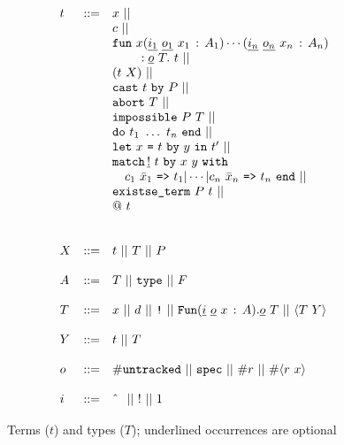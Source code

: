\documentclass[9pt,natbib]{sigplanconf}
\newcommand{\Eq}[0]{\texttt{=}}
\newcommand{\bang}[0]{\texttt{!}}
\begin{document}
\begin{figure}
\[
\begin{array}{lll}
t & ::= & x\ || \\
\ & \ &   c\ ||\\ 
\ & \ &    \texttt{fun}\ x(\underline{i_1}\ \underline{o_1}\ x_1\,:\,A_1)\cdots(\underline{i_n}\ \underline{o_n}\ x_n\,:\, A_n)\\
\ & \ & \ \ \ \ \ \ \  : \underline{o}\ T .\ t\ ||\\
\ & \ &    (t\ X)\ || \\ 
\ & \ &         \texttt{cast}\ t\ \texttt{by}\ P  \ ||\\
\ & \ &  \texttt{abort}\ T\ ||\\ 
\ & \ &  \texttt{impossible}\ P\ T\ ||\\ 
\ & \ &  \texttt{do}\ t_1\ \ldots\ t_n\ \texttt{end}\ ||\\ 
\ & \ &  \texttt{let}\ x\ \Eq\ t\ \texttt{by}\ y\ \texttt{in}\ t' \ ||\ 
\\ 
\ & \ &  \texttt{match}\, \underline{!}\ t\ \texttt{by}\ x\ y \ \texttt{with}\\
\ & \ &  \ \ \ c_1\ \bar{x}_1\ \texttt{=>}\ t_1 |
 \cdots | c_n\ \bar{x}_n\ \texttt{=>}\ t_n\ \texttt{end}\ ||\\
\ & \ &  \texttt{existse\_term}\ P\ t\ || \\
\ & \ &  @\ t \\
\\
\\
X & ::= & t\ ||\ T\ ||\ P
\\
\\
A & ::= & T\ ||\ \texttt{type}\ ||\ F 
\\
\\
T & ::= & x\ ||\ d\ ||\ \bang\ ||\ 
     \texttt{Fun}(\underline{i}\ \underline{o}\ x\,:\,A) . \underline{o}\ T\ ||\ \langle T\ Y\rangle 
\\
\\
Y & ::= & t\ ||\ T
\\
\\
o & ::= & \#\texttt{untracked}\ ||\ \texttt{spec}\ ||\ \#r\ ||\ \#\langle r\ x\rangle
\\
\\
i & ::= & \textnormal{\^{\ }}\ ||\ !\ ||\ 1
\end{array}
\]
\caption{\label{fig:terms} Terms ($t$) and types ($T$); underlined occurrences are optional}
\end{figure}
\end{document}

